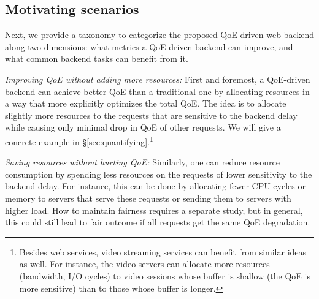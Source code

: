 \subsection{Motivating scenarios}
\label{subsec:benefits}
Next, we provide a taxonomy to categorize the proposed QoE-driven web backend along two dimensions: 
what metrics a QoE-driven backend can improve, and what common backend tasks can benefit from it.

\begin{packeditemize}
\item{\em Improving QoE without adding more resources:} 
First and foremost, a QoE-driven backend can achieve better QoE than a traditional one by allocating resources in a way that more explicitly optimizes the total QoE. 
The idea is to allocate slightly more resources to the requests that are sensitive to the backend delay while causing only minimal drop in QoE of other requests.
We will give a concrete example in \S\ref{sec:quantifying}.\footnote{Besides web services, video streaming services can benefit from similar ideas as well. For instance, the video servers can allocate more resources (\eg bandwidth, I/O cycles) to video sessions whose buffer is shallow (\ie the QoE is more sensitive) than to those whose buffer is longer.}

\item{\em Saving resources without hurting QoE:}
Similarly, one can reduce resource consumption by spending less resources on the requests of lower sensitivity to the backend delay. For instance, this can be done by allocating fewer CPU cycles or memory to servers that serve these requests or sending them to servers with higher load. How to maintain fairness requires a separate study, but in general, this could still lead to fair outcome if all requests get the same QoE degradation.


\end{packeditemize}
